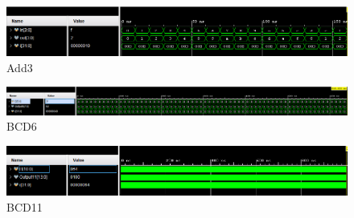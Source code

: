 \documentclass[11pt]{article}
\begin{document}
	\begin{figure}[ht]\centering
		
		
		
		\includegraphics[width=1\textwidth,angle=0,origin=c]{add3_test.PNG}
		\caption{Add3}
		\label{fig:sim_with_table}
		
	\end{figure}

	\begin{figure}[ht]\centering
		
		
		
		\includegraphics[width=1\textwidth,angle=0,origin=c]{BCD6_test.PNG}
		\caption{BCD6}
		\label{fig:sim_with_table}
		
	\end{figure}
	
	

	
	\begin{figure}[ht]\centering
		
		
		
		\includegraphics[width=1\textwidth,angle=0,origin=c]{BCD11.PNG}
		\caption{BCD11}
		\label{fig:sim_with_table}
		
	\end{figure}
\end{document}

